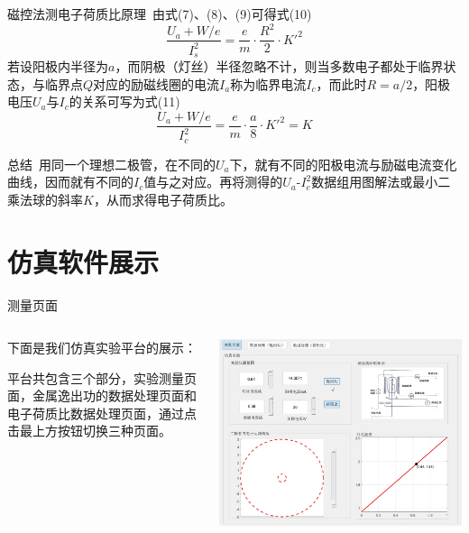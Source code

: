 \documentclass{beamer}
\begin{document}
    \begin{frame}{磁控法测电子荷质比原理}{\thesubsection \, \subsecname}
        由式(7)、(8)、(9)可得式(10)
        \begin{equation}
            \frac{U_a+W/e}{I_s^2} = \frac{e}{m} \cdot \frac{R^2}{2}\cdot K'^2
        \end{equation}
        若设阳极内半径为$a$，而阴极（灯丝）半径忽略不计，则当多数电子都处于临界状态，与临界点$Q$对应的励磁线圈的电流$I_a$称为临界电流$I_c$，而此时$R = a/2$，阳极电压$U_a$与$I_c$的关系可写为式(11)
        \begin{equation}
            \frac{U_a+W/e}{I_c^2} = \frac{e}{m} \cdot \frac{a}{8}\cdot K'^2 = K
        \end{equation}
    \end{frame}

    \begin{frame}{总结}{\thesubsection \, \subsecname}
        用同一个理想二极管，在不同的$U_a$下，就有不同的阳极电流与励磁电流变化曲线，因而就有不同的$I_c$值与之对应。再将测得的$U_a$-$I_c^2$数据组用图解法或最小二乘法球的斜率$K$，从而求得电子荷质比。
    \end{frame}

    \section{仿真软件展示}
    \begin{frame}{测量页面}{\thesection \, \secname}
        \begin{columns}[T]
            \begin{column}{0.4\textwidth}
                下面是我们仿真实验平台的展示：

                平台共包含三个部分，实验测量页面，金属逸出功的数据处理页面和电子荷质比数据处理页面，通过点击最上方按钮切换三种页面。
            \end{column}
            \begin{column}{0.3\textwidth}
                \includegraphics[scale=0.22]{gallery/pic3.jpg}
            \end{column}
        \end{columns}
        
    \end{frame}
\end{document}
